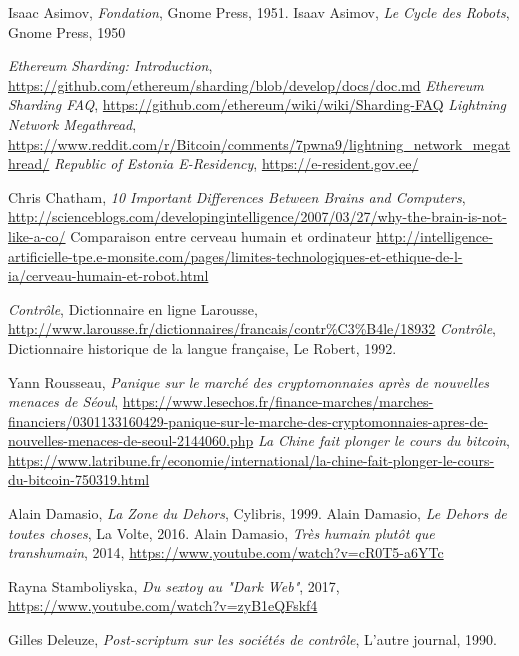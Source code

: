 \begin{thebibliography}{99}
     Isaac Asimov, \emph{Fondation}, Gnome Press, 1951.
     Isaav Asimov, \emph{Le Cycle des Robots}, Gnome Press, 1950

     \emph{Ethereum Sharding: Introduction}, \url{https://github.com/ethereum/sharding/blob/develop/docs/doc.md}
     \emph{Ethereum Sharding FAQ}, \url{https://github.com/ethereum/wiki/wiki/Sharding-FAQ}
     \emph{Lightning Network Megathread}, \url{https://www.reddit.com/r/Bitcoin/comments/7pwna9/lightning_network_megathread/}
     \emph{Republic of Estonia E-Residency}, \url{https://e-resident.gov.ee/}

     Chris Chatham, \emph{10 Important Differences Between Brains and Computers}, \url{http://scienceblogs.com/developingintelligence/2007/03/27/why-the-brain-is-not-like-a-co/}
     Comparaison entre cerveau humain et ordinateur \url{http://intelligence-artificielle-tpe.e-monsite.com/pages/limites-technologiques-et-ethique-de-l-ia/cerveau-humain-et-robot.html}
    
     \emph{Contrôle}, Dictionnaire en ligne Larousse, \url{http://www.larousse.fr/dictionnaires/francais/contr%C3%B4le/18932}
     \emph{Contrôle}, Dictionnaire historique de la langue française, Le Robert, 1992.

     Yann Rousseau, \emph{Panique sur le marché des cryptomonnaies après de nouvelles menaces de Séoul}, \url{https://www.lesechos.fr/finance-marches/marches-financiers/0301133160429-panique-sur-le-marche-des-cryptomonnaies-apres-de-nouvelles-menaces-de-seoul-2144060.php}
     \emph{La Chine fait plonger le cours du bitcoin}, \url{https://www.latribune.fr/economie/international/la-chine-fait-plonger-le-cours-du-bitcoin-750319.html}

     Alain Damasio, \emph{La Zone du Dehors}, Cylibris, 1999.
     Alain Damasio, \emph{Le Dehors de toutes choses}, La Volte, 2016.
     Alain Damasio, \emph{Très humain plutôt que transhumain}, 2014, \url{https://www.youtube.com/watch?v=cR0T5-a6YTc}

     Rayna Stamboliyska, \emph{Du sextoy au "Dark Web"}, 2017, \url{https://www.youtube.com/watch?v=zyB1eQFskf4}

     Gilles Deleuze, \emph{Post-scriptum sur les sociétés de contrôle}, L'autre journal, 1990.


\end{thebibliography}
